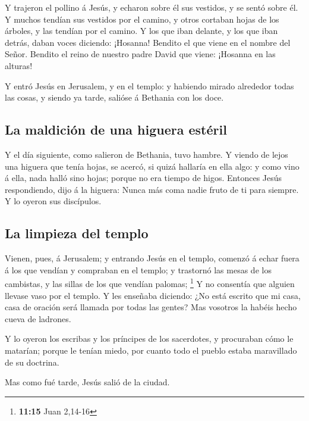  Y trajeron el pollino á Jesús, y echaron sobre él sus
vestidos, y se sentó sobre él.  Y muchos tendían sus
vestidos por el camino, y otros cortaban hojas de los árboles, y las
tendían por el camino.  Y los que iban delante, y los que
iban detrás, daban voces diciendo: ¡Hosanna! Bendito el que viene en el
nombre del Señor.  Bendito el reino de nuestro padre David
que viene: ¡Hosanna en las alturas!

 Y entró Jesús en Jerusalem, y en el templo: y habiendo
mirado alrededor todas las cosas, y siendo ya tarde, salióse á Bethania
con los doce.

\hypertarget{la-maldiciuxf3n-de-una-higuera-estuxe9ril}{%
\subsection{La maldición de una higuera
estéril}\label{la-maldiciuxf3n-de-una-higuera-estuxe9ril}}

 Y el día siguiente, como salieron de Bethania, tuvo
hambre.  Y viendo de lejos una higuera que tenía hojas, se
acercó, si quizá hallaría en ella algo: y como vino á ella, nada halló
sino hojas; porque no era tiempo de higos.  Entonces Jesús
respondiendo, dijo á la higuera: Nunca más coma nadie fruto de ti para
siempre. Y lo oyeron sus discípulos.

\hypertarget{la-limpieza-del-templo}{%
\subsection{La limpieza del templo}\label{la-limpieza-del-templo}}

 Vienen, pues, á Jerusalem; y entrando Jesús en el templo,
comenzó á echar fuera á los que vendían y compraban en el templo; y
trastornó las mesas de los cambistas, y las sillas de los que vendían
palomas; \footnote{\textbf{11:15} Juan 2,14-16}  Y no
consentía que alguien llevase vaso por el templo.  Y les
enseñaba diciendo: ¿No está escrito que mi casa, casa de oración será
llamada por todas las gentes? Mas vosotros la habéis hecho cueva de
ladrones.

 Y lo oyeron los escribas y los príncipes de los
sacerdotes, y procuraban cómo le matarían; porque le tenían miedo, por
cuanto todo el pueblo estaba maravillado de su doctrina.

 Mas como fué tarde, Jesús salió de la ciudad.

